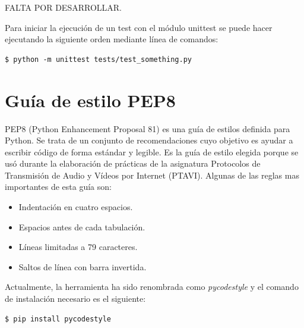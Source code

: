 \documentclass[a4paper, 12pt]{book}
\begin{document}
FALTA POR DESARROLLAR. 
 
Para iniciar la ejecución de un test con el módulo unittest se puede hacer ejecutando la siguiente orden mediante línea de comandos:

\begin{lstlisting}[style=consola,numbers=none]
$ python -m unittest tests/test_something.py
\end{lstlisting}

\section{Guía de estilo PEP8} 
\label{sec:pep8}

PEP8 (Python Enhancement Proposal 81) es una guía de estilos definida para Python. Se trata de un conjunto de recomendaciones cuyo objetivo es ayudar a escribir código de forma estándar y legible. Es la guía de estilo elegida porque se usó durante la elaboración de prácticas de la asignatura Protocolos de Transmisión de Audio y Vídeos por Internet (PTAVI). Algunas de las reglas mas importantes de esta guía son:

\begin{itemize}
	\item Indentación en cuatro espacios.
	\item Espacios antes de cada tabulación.
	\item Líneas limitadas a 79 caracteres.
	\item Saltos de línea con barra invertida.
\end{itemize}

Actualmente, la herramienta ha sido renombrada como \textit{pycodestyle} y el comando de instalación necesario es el siguiente:

\begin{lstlisting}[style=consola,numbers=none]
$ pip install pycodestyle
\end{lstlisting}


\end{document}

